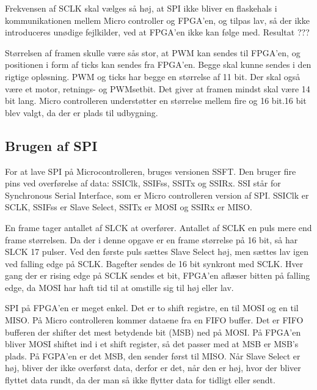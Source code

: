 Frekvensen af SCLK skal vælges så høj, at SPI ikke bliver en flaskehals i kommunikationen mellem Micro controller og FPGA’en, og tilpas lav, så der ikke introduceres unødige fejlkilder, ved at FPGA’en ikke kan følge med. Resultat ???


Størrelsen af framen skulle være sås stor, at PWM kan sendes til FPGA’en, og positionen i form af ticks kan sendes fra FPGA’en. Begge skal kunne sendes i den rigtige opløsning. PWM og ticks har begge en størrelse af 11 bit. Der skal også være et motor, retnings- og PWMsetbit. Det giver at framen mindst skal være 14 bit lang. Micro controlleren understøtter en størrelse mellem fire og 16 bit.16 bit blev valgt, da der er plads til udbygning.



\subsection{Brugen af SPI}

For at lave SPI på Microcontrolleren, bruges versionen SSFT. Den bruger fire pins ved overførelse af data: SSIClk, SSIFss, SSITx og SSIRx. SSI står for Synchronous Serial Interface, som er Micro controlleren version af SPI. SSIClk er SCLK, SSIFss er Slave Select, SSITx er MOSI og SSIRx er MISO.


En frame tager antallet af SLCK at overfører. Antallet af SCLK en puls mere end frame størrelsen. Da der i denne opgave er en frame størrelse på 16 bit, så har SLCK 17 pulser. Ved den første puls sættes Slave Select høj, men sættes lav igen ved falling edge på SCLK. Bagefter sendes de 16 bit synkront med SCLK. Hver gang der er rising edge på SCLK sendes et bit, FPGA’en aflæser bitten på falling edge, da MOSI har haft tid til at omstille sig til høj eller lav.

SPI på FPGA’en er meget enkel. Det er to shift registre, en til MOSI og en til MISO. På Micro controlleren kommer dataene fra en FIFO buffer. Det er FIFO bufferen der shifter det mest betydende bit (MSB) ned på MOSI. På FPGA’en bliver MOSI shiftet ind i et shift register, så det passer med at MSB er MSB’s plads. På FGPA’en er det MSB, den sender først til MISO. Når Slave Select er høj, bliver der ikke overførst data, derfor er det, når den er høj, hvor der bliver flyttet data rundt, da der man så ikke flytter data for tidligt eller sendt. 


